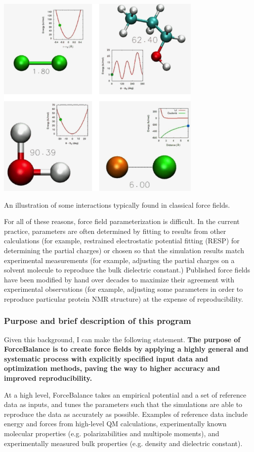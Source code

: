 \begin{DoxyImage}
\includegraphics[width=10cm]{interactions.png}
\caption{An illustration of some interactions typically found in classical force fields.}
\end{DoxyImage}


For all of these reasons, force field parameterization is difficult. In the current practice, parameters are often determined by fitting to results from other calculations (for example, restrained electrostatic potential fitting (R\-E\-S\-P) for determining the partial charges) or chosen so that the simulation results match experimental measurements (for example, adjusting the partial charges on a solvent molecule to reproduce the bulk dielectric constant.) Published force fields have been modified by hand over decades to maximize their agreement with experimental observations (for example, adjusting some parameters in order to reproduce particular protein N\-M\-R structure) at the expense of reproducibility.\hypertarget{index_mission_statement}{}\subsubsection{Purpose and brief description of this program}\label{index_mission_statement}
Given this background, I can make the following statement. {\bfseries The purpose of Force\-Balance is to create force fields by applying a highly general and systematic process with explicitly specified input data and optimization methods, paving the way to higher accuracy and improved reproducibility. }

At a high level, Force\-Balance takes an empirical potential and a set of reference data as inputs, and tunes the parameters such that the simulations are able to reproduce the data as accurately as possible. Examples of reference data include energy and forces from high-\/level Q\-M calculations, experimentally known molecular properties (e.\-g. polarizabilities and multipole moments), and experimentally measured bulk properties (e.\-g. density and dielectric constant).

